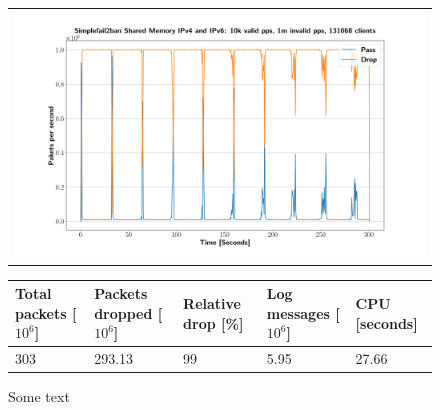 \begin{figure}[p]
	\label{fig:simplefail2ban:shm:ip46:1m}
	\centering
	\scriptsize
	\begin{tabular}{c}
    	\centerline{\includegraphics[width=1.2\textwidth]{images/simplefail2ban_shm_ipv46_v10k_iv1m_c131068.png}}
	\end{tabular}
	\begin{tabular}{lllll}
		\toprule
		\textbf{Total packets [$10^6$]} & \textbf{Packets dropped [$10^6$]} & \textbf{Relative drop [\%]} & \textbf{Log messages [$10^6$]} & \textbf{CPU [seconds]} \\ \midrule 
		303 & 293.13 & 99 & 5.95 & 27.66 \\
		\bottomrule
	\end{tabular}
	\caption[Simplefail2ban Shared Memory IPv4 \& IPv6 1m PPS]{Some text}
\end{figure}

